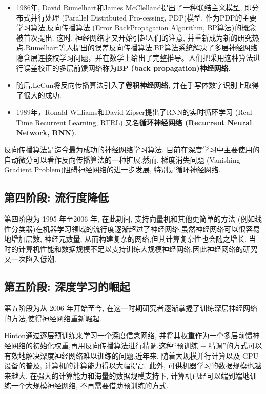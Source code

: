 \begin{itemize}
\item 1986年, David Rumelhart和James McClelland提出了一种联结主义模型, 即分布式并行处理 (Parallel Distributed Pro-cessing, PDP)模型\cite{McClelland1986}, 作为PDP的主要学习算法,反向传播算法 (Error BackPropagation Algorithm, BP算法)的概念被首次提出. 这时, 神经网络才又开始引起人们的注意, 并重新成为新的研究热点.Rumelhart等人提出的误差反向传播算法\cite{Rumelhart1986}.BP算法系统解决了多层神经网络隐含层连接权学习问题，并在数学上给出了完整推导。人们把采用这种算法进行误差校正的多层前馈网络称为\textbf{BP (back propagation)神经网络}.

\item 随后,LeCun将反向传播算法引入了\textbf{卷积神经网络}\cite{LeCun1989}, 并在手写体数字识别上取得了很大的成功.

\item 1989年，Ronald Williams和David Zipser提出了RNN的实时循环学习 (Real-Time Recurrent Learning, RTRL).又名\textbf{循环神经网络 (Recurrent Neural Network, RNN)}\cite{Williams1989}.
\end{itemize}

反向传播算法是迄今最为成功的神经网络学习算法. 目前在深度学习中主要使用的自动微分可以看作反向传播算法的一种扩展.然而, 梯度消失问题 (Vanishing Gradient Problem)阻碍神经网络的进一步发展, 特别是循环神经网络.

\subsection{第四阶段: 流行度降低}

第四阶段为 1995 年至2006 年, 在此期间, 支持向量机和其他更简单的方法 (例如线性分类器)在机器学习领域的流行度逐渐超过了神经网络.虽然神经网络可以很容易地增加层数, 神经元数量, 从而构建复杂的网络,但其计算复杂性也会随之增长. 当时的计算机性能和数据规模不足以支持训练大规模神经网络.因此神经网络的研究又一次陷入低潮.

\subsection{第五阶段: 深度学习的崛起}

第五阶段为从 2006 年开始至今, 在这一时期研究者逐渐掌握了训练深层神经网络的方法,使得神经网络重新崛起.

Hinton通过逐层预训练来学习一个深度信念网络, 并将其权重作为一个多层前馈神经网络的初始化权重,再用反向传播算法进行精调\cite{Hinton2006}.这种“预训练 + 精调”的方式可以有效地解决深度神经网络难以训练的问题.近年来, 随着大规模并行计算以及 GPU 设备的普及, 计算机的计算能力得以大幅提高. 此外, 可供机器学习的数据规模也越来越大. 在强大的计算能力和海量的数据规模支持下, 计算机已经可以端到端地训练一个大规模神经网络, 不再需要借助预训练的方式.

